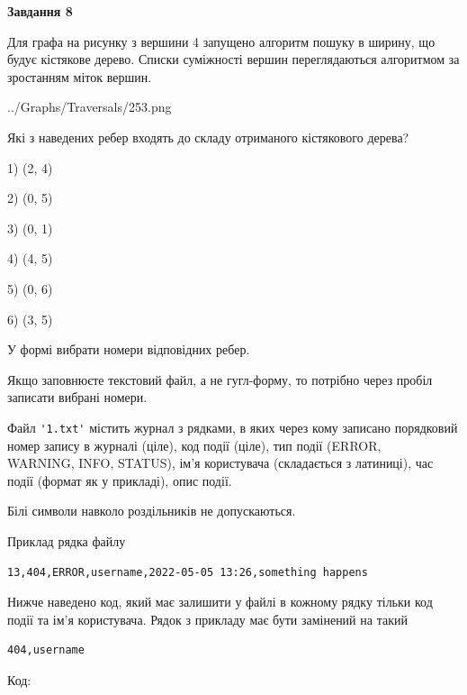 \documentclass[12pt, ukrainian]{article}
\def\code#1{\Verb!#1!}
\begin{document}
{\begin {large}
{\begin {center}\textbf{Завдання 8}\end {center}}\par
Для графа на рисунку з вершини 4 запущено алгоритм пошуку в ширину, що будує кістякове дерево. Списки суміжності вершин переглядаються алгоритмом за зростанням міток вершин.\par
\begin{center}
	{../Graphs/Traversals/253.png}
\end{center}
\par Які з наведених ребер входять до складу отриманого кістякового дерева?\par
1) (2, 4)\par
2) (0, 5)\par
3) (0, 1)\par
4) (4, 5)\par
5) (0, 6)\par
6) (3, 5)\par
{\vskip 15pt} У формі вибрати номери відповідних ребер.


Якщо заповнюєте текстовий файл, а не гугл-форму, то потрібно через пробіл записа\-ти вибрані номери.\par
\newpage


Файл \code{'1.txt'} містить журнал з рядками, в яких через кому записано поряд\-ко\-вий номер запису в журналі (ціле), код події (ціле), тип події (ERROR, \\WARNING, INFO, STATUS), ім'я користувача (складається з латиниці), час події (фор\-мат як у прикладі), опис події.

Білі символи навколо роздільників не допускаються.

Приклад рядка файлу



\begin{verbatim}
13,404,ERROR,username,2022-05-05 13:26,something happens
\end{verbatim}


Нижче наведено код, який має залишити у файлі в кожному рядку тільки код події та ім'я користувача. Рядок з прикладу має бути замінений на такий



\begin{verbatim}
404,username
\end{verbatim}




Код:




\end{large}}
\end{document}
